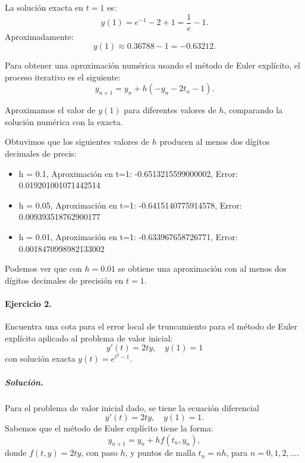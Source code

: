 \documentclass[12pt,letterpaper,oneside]{article}
\begin{document}
La solución exacta en \( t = 1 \) es:
\[
y(1) = e^{-1} - 2 + 1 = \frac{1}{e} - 1.
\]
Aproximadamente:
\[
y(1) \approx 0.36788 - 1 = -0.63212.
\]

Para obtener una aproximación numérica usando el método de Euler explícito, el proceso iterativo es el siguiente:
\[
y_{n+1} = y_n + h (-y_n - 2t_n - 1).
\]

Aproximamos el valor de \( y(1) \) para diferentes valores de \( h \), comparando la solución numérica con la exacta.

 Obtuvimos que los siguientes valores de \( h \) producen al menos dos dígitos decimales de precis:
 \begin{itemize}
    \item h = 0.1, Aproximación en t=1: -0.6513215599000002, Error: 0.019201001071442514
    \item h = 0.05, Aproximación en t=1: -0.6415140775914578, Error: 0.009393518762900177
    \item h = 0.01, Aproximación en t=1: -0.633967658726771, Error: 0.0018470998982133002
    
 \end{itemize}

 Podemos ver que con \( h = 0.01 \) se obtiene una aproximación con al menos dos dígitos decimales de precisión en \( t = 1 \).


\paragraph*{Ejercicio 2.} Encuentra una cota para el error local de truncamiento para el método de Euler explícito aplicado al problema de valor inicial:
\[
y'(t) = 2ty,\quad y(1) = 1
\]
con solución exacta \(y(t)=e^{t^2-1}\).

\subparagraph*{Solución.} Para el problema de valor inicial dado, se tiene la ecuación diferencial 
\[
y'(t) = 2ty,\quad y(1) = 1.
\]
Sabemos que el método de Euler explícito tiene la forma:
\[
y_{n+1} = y_n + h f(t_n, y_n),
\]
donde \(f(t, y) = 2ty\), con paso \(h\), y puntos de malla \(t_n = nh\), para \(n = 0, 1, 2, \dots\).
\end{document}
